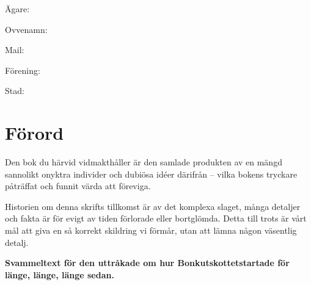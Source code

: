 \pagestyle{Inledning}




Ägare: \underline{\hspace{3cm}}

Ovvenamn: \underline{\hspace{3cm}}

Mail: \underline{\hspace{3cm}}

Förening: \underline{\hspace{3cm}}

Stad: \underline{\hspace{3cm}}

\newpage


\section{\textbf{Förord}}

Den bok du härvid vidmakthåller är den samlade produkten av en mängd sannolikt onyktra individer och dubiösa idéer därifrån -- vilka bokens tryckare påträffat och funnit värda att föreviga.

Historien om denna skrifts tillkomst är av det komplexa slaget, många detaljer och fakta är för evigt av tiden förlorade eller bortglömda. Detta till trots är vårt mål att giva en så korrekt skildring vi förmår, utan att lämna någon väsentlig detalj.

\textbf{Svammeltext för den uttråkade om hur Bonkutskottetstartade för länge, länge, länge sedan.}

